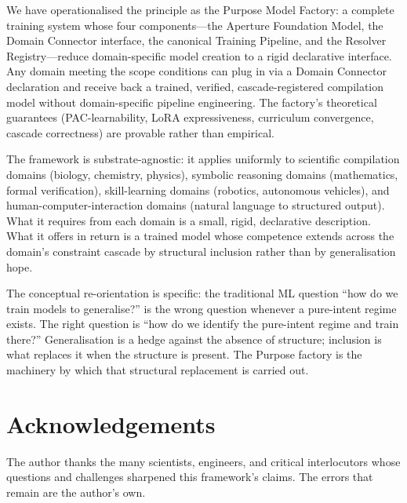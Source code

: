 \documentclass[twocolumn,11pt,a4paper]{article}
\begin{document}
We have operationalised the principle as the Purpose Model Factory: a complete training system whose four components---the Aperture Foundation Model, the Domain Connector interface, the canonical Training Pipeline, and the Resolver Registry---reduce domain-specific model creation to a rigid declarative interface. Any domain meeting the scope conditions can plug in via a Domain Connector declaration and receive back a trained, verified, cascade-registered compilation model without domain-specific pipeline engineering. The factory's theoretical guarantees (PAC-learnability, LoRA expressiveness, curriculum convergence, cascade correctness) are provable rather than empirical.

The framework is substrate-agnostic: it applies uniformly to scientific compilation domains (biology, chemistry, physics), symbolic reasoning domains (mathematics, formal verification), skill-learning domains (robotics, autonomous vehicles), and human-computer-interaction domains (natural language to structured output). What it requires from each domain is a small, rigid, declarative description. What it offers in return is a trained model whose competence extends across the domain's constraint cascade by structural inclusion rather than by generalisation hope.

The conceptual re-orientation is specific: the traditional ML question ``how do we train models to generalise?'' is the wrong question whenever a pure-intent regime exists. The right question is ``how do we identify the pure-intent regime and train there?'' Generalisation is a hedge against the absence of structure; inclusion is what replaces it when the structure is present. The Purpose factory is the machinery by which that structural replacement is carried out.


\section*{Acknowledgements}

The author thanks the many scientists, engineers, and critical interlocutors whose questions and challenges sharpened this framework's claims. The errors that remain are the author's own.




\end{document}
